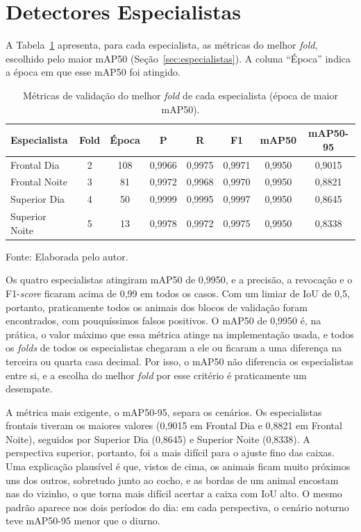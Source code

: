 \section{Detectores Especialistas}
\label{sec:res-especialistas}

A Tabela~\ref{tab:res-especialistas} apresenta, para cada especialista, as métricas do melhor \textit{fold}, escolhido pelo maior mAP50 (Seção~\ref{sec:especialistas}). A coluna ``Época'' indica a época em que esse mAP50 foi atingido.

\begin{table}[htb]
\centering
\caption{Métricas de validação do melhor \textit{fold} de cada especialista (época de maior mAP50).}
\label{tab:res-especialistas}
\begin{tabular}{lccccccc}
\hline
\textbf{Especialista} & \textbf{Fold} & \textbf{Época} & \textbf{P} & \textbf{R} & \textbf{F1} & \textbf{mAP50} & \textbf{mAP50-95} \\
\hline
Frontal Dia & 2 & 108 & 0,9966 & 0,9975 & 0,9971 & 0,9950 & 0,9015 \\
Frontal Noite & 3 & 81 & 0,9972 & 0,9968 & 0,9970 & 0,9950 & 0,8821 \\
Superior Dia & 4 & 50 & 0,9999 & 0,9995 & 0,9997 & 0,9950 & 0,8645 \\
Superior Noite & 5 & 13 & 0,9978 & 0,9972 & 0,9975 & 0,9950 & 0,8338 \\
\hline
\end{tabular}

\vspace{0.2cm}
Fonte: Elaborada pelo autor.
\end{table}

Os quatro especialistas atingiram mAP50 de 0,9950, e a precisão, a revocação e o F1-\textit{score} ficaram acima de 0,99 em todos os casos. Com um limiar de IoU de 0,5, portanto, praticamente todos os animais dos blocos de validação foram encontrados, com pouquíssimos falsos positivos. O mAP50 de 0,9950 é, na prática, o valor máximo que essa métrica atinge na implementação usada, e todos os \textit{folds} de todos os especialistas chegaram a ele ou ficaram a uma diferença na terceira ou quarta casa decimal. Por isso, o mAP50 não diferencia os especialistas entre si, e a escolha do melhor \textit{fold} por esse critério é praticamente um desempate.

A métrica mais exigente, o mAP50-95, separa os cenários. Os especialistas frontais tiveram os maiores valores (0,9015 em Frontal Dia e 0,8821 em Frontal Noite), seguidos por Superior Dia (0,8645) e Superior Noite (0,8338). A perspectiva superior, portanto, foi a mais difícil para o ajuste fino das caixas. Uma explicação plausível é que, vistos de cima, os animais ficam muito próximos uns dos outros, sobretudo junto ao cocho, e as bordas de um animal encostam nas do vizinho, o que torna mais difícil acertar a caixa com IoU alto. O mesmo padrão aparece nos dois períodos do dia: em cada perspectiva, o cenário noturno teve mAP50-95 menor que o diurno.

